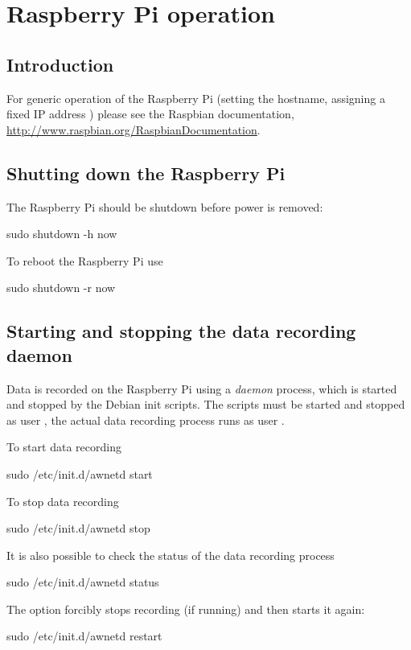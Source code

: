 \chapter{Raspberry Pi operation}

\section{Introduction}

For generic operation of the Raspberry Pi (setting the hostname,
assigning a fixed IP address \etc) please see the Raspbian
documentation,
\url{http://www.raspbian.org/RaspbianDocumentation}.

\section{Shutting down the Raspberry Pi}

The Raspberry Pi should be shutdown before power is removed:
\begin{Cmd}
sudo shutdown -h now
\end{Cmd}

To reboot the Raspberry Pi use
\begin{Cmd}
sudo shutdown -r now
\end{Cmd}

\section{Starting and stopping the data recording daemon}

Data is recorded on the Raspberry Pi using a \emph{daemon} process,
which is started and stopped by the Debian init scripts. The scripts
must be started and stopped as user \rootUser, the actual data
recording process runs as user \piUser.

To start data recording
\begin{Cmd}
sudo /etc/init.d/awnetd start
\end{Cmd}

To stop data recording
\begin{Cmd}
sudo /etc/init.d/awnetd stop
\end{Cmd}

It is also possible to check the status of the data recording process
\begin{Cmd}
sudo /etc/init.d/awnetd status
\end{Cmd}

\label{awnetd-restart}
The  option forcibly stops recording (if running) and
then starts it again:
\begin{Cmd}
sudo /etc/init.d/awnetd restart
\end{Cmd}

